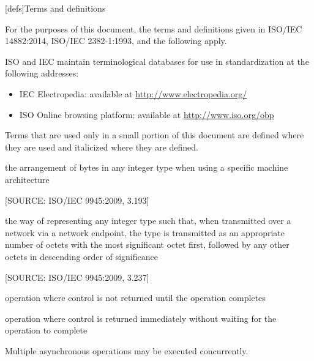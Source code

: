 
[defs]{Terms and definitions}

\pnum
{}%
For the purposes of this document,
the terms and definitions
given in ISO/IEC 14882:2014,
ISO/IEC 2382-1:1993,
and the following apply.

\pnum
ISO and IEC maintain terminological databases
for use in standardization
at the following addresses:
\begin{itemize}
\item IEC Electropedia: available at \url{http://www.electropedia.org/}
\item ISO Online browsing platform: available at \url{http://www.iso.org/obp}
\end{itemize}

\pnum
Terms that are used only in a small portion of this document
are defined where they are used and italicized where they are
defined.

%
the arrangement of bytes in any integer type when using a specific machine architecture

[SOURCE: ISO/IEC 9945:2009, 3.193]

%
the way of representing any integer type such that, when transmitted over a network via a network endpoint,
the  type is transmitted as an appropriate number of octets with the most significant octet first,
followed by any other octets in descending order of significance

[SOURCE: ISO/IEC 9945:2009, 3.237]

%
operation where control is not returned until the operation completes

%
operation where control is returned immediately without waiting for the operation to complete

\begin{defnote}Multiple asynchronous operations may be executed concurrently.\end{defnote}

\setcounter{tocdepth}{1}
